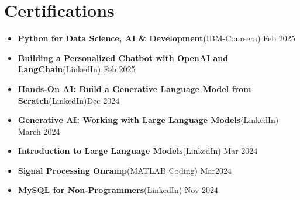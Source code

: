 \documentclass[10 pt, letterpaper]{article}
\begin{document}
\section*{Certifications}
\begin{itemize}
    \item\textbf{Python for Data Science, AI \& Development}(IBM-Coursera) \hfill {Feb 2025}
    \vspace{-0.23cm}
    \item\textbf{Building a Personalized Chatbot with OpenAI and LangChain}(LinkedIn) \hfill Feb 2025  
       \vspace{-0.23cm}
 
    \item\textbf{Hands-On AI: Build a Generative Language Model from Scratch}(LinkedIn)\hfill Dec 2024
    \vspace{-0.25cm}
    \item \textbf{Generative AI: Working with Large Language Models}(LinkedIn) \hfill March 2024
    \vspace{-0.25cm}
    \item \textbf{Introduction to Large Language Models}(LinkedIn) \hfill Mar 2024 
       \vspace{-0.25cm}
    \item \textbf{Signal Processing Onramp}(MATLAB Coding) \hfill {Mar2024}
       \vspace{-0.25cm}
    \item\textbf{MySQL for Non-Programmers}(LinkedIn) \hfill {Nov 2024} 
     \vspace{-0.25cm}
\end{itemize}


\end{document}
